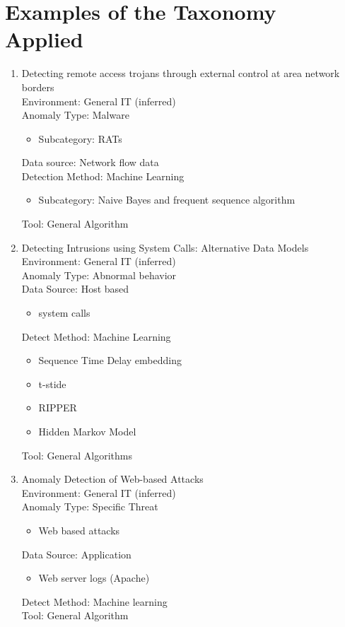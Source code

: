 \documentclass[10pt]{IEEEtran}
\begin{document}
\section{Examples of the Taxonomy Applied}
\begin{enumerate}
    \item 
    Detecting remote access trojans through external control at area network borders\cite{wu2017detecting} \\
    Environment: General IT (inferred) \\
    Anomaly Type: Malware 
    \begin{itemize}
        \item Subcategory: RATs
    \end{itemize}  
    Data source: Network flow data\\ 
    Detection Method: Machine Learning
    \begin{itemize}
        \item Subcategory: Naive Bayes and frequent sequence algorithm
    \end{itemize} 
    Tool: General Algorithm
    
    \item 
    Detecting Intrusions using System Calls: Alternative Data Models\cite{warrender1999detecting}\\
    Environment: General IT (inferred)\\
    Anomaly Type: Abnormal behavior \\
    Data Source: Host based 
    \begin{itemize}
        \item system calls
    \end{itemize}
    Detect Method: Machine Learning
    \begin{itemize}
        \item Sequence Time Delay embedding
        \item t-stide
        \item RIPPER
        \item Hidden Markov Model
    \end{itemize} 
    Tool: General Algorithms
    
    \item  
    Anomaly Detection of Web-based Attacks\cite{kruegel2003anomaly}\\
    Environment: General IT (inferred) \\   
    Anomaly Type: Specific Threat 
    \begin{itemize}
        \item Web based attacks
    \end{itemize}
    Data Source: Application
    \begin{itemize}
        \item Web server logs (Apache)
    \end{itemize}
    Detect Method: Machine learning\\
    Tool: General Algorithm
    

\end{enumerate}
\end{document}
